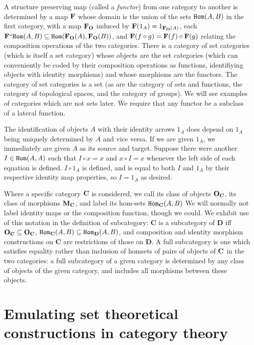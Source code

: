 \documentclass[12pt]{article}
\begin{document}
A structure preserving map (called a {\em functor}) from one category to another is determined by a map ${\bf F}$ whose domain is the union of the sets ${\tt Hom}(A,B)$ in the first category, with a map ${\bf F_O}$ induced by ${\bf F}(1_A) = 1_{{\bf F_O}(A)}$, each ${\bf F}``{\tt Hom}(A,B) \subseteq {\tt Hom}({\bf F_O}(A),{\bf F_O}(B))$, and
${\bf F}(f \circ g) = {\bf F}(f) \circ {\bf F}(g)$ relating the composition operations of the two categories.   There is a category of set categories (which is itself a set category) whose objects are the set categories (which can conveniently be coded by their composition operations as functions, identifiying objects with identity morphisms) and whose morphisms are the functors.   The category of set categories is a set (as are the category of sets and functions, the category of topological spaces, and the category of groups).  We will see examples of categories which are not sets later.  We require that any functor be a subclass of a lateral function.

The identification of objects $A$ with their identity arrows $1_A$ does depend on $1_A$ being uniquely determined by $A$ and vice versa.  If we are given $1_A$, we immediately are given $A$ as its source and target.  Suppose there were another $I \in {\tt Hom}(A,A)$ such that $I \circ x = x$ and $x \circ I = x$ whenever the left side of each equation is defined.
$I \circ 1_A$ is defined, and is equal to both $I$ and $1_A$ by their respective identity map properties, so $I=1_A$ as desired.

Where a specific category ${\bf C}$ is considered, we call its class of objects ${\bf O_C}$, its class of morphisms ${\bf M_C}$, and  label its hom-sets ${\tt Hom}_{\bf C}(A,B)$  We will normally not label identity maps or the composition function, though we could.  We exhibit use of this notation in the definition of subcategory:  {\bf C} is a subcategory of {\bf D} iff
${\bf O_C} \subseteq {\bf O_C}$, ${\tt Hom}_{\bf C}(A,B) \subseteq {\tt Hom}_{\bf D}(A,B)$, and composition and identity morphism constructions on {\bf C} are restrictions of  those on {\bf D}.  A full subcategory is one which satisfies equality rather than inclusion of homsets of pairs of objects of ${\bf C}$ in the two categories:  a full subcategory of a given category is determined
by any class of objects of the given category, and includes all morphisms between these objects.

\section{Emulating set theoretical constructions in category theory}
\end{document}
